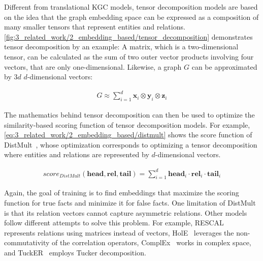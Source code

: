 Different from translational KGC models, tensor decomposition models are based on the idea that the graph embedding space can be expressed as a composition of many smaller tensors that represent entities and relations. \autoref{fig:3_related_work/2_embedding_based/tensor_decomposition} demonstrates tensor decomposition by an example: A matrix, which is a two-dimensional tensor, can be calculated as the sum of two outer vector products involving four vectors, that are only one-dimensional. Likewise, a graph $G$ can be approximated by $3d$ $d$-dimensional vectors:

\begin{align}
    G \approx \sum_{i=1}^{d} \textbf{x}_i \otimes \textbf{y}_i \otimes \textbf{z}_i
    \label{eq:3_related_work/2_embedding_based/tensor_decomposition}
\end{align}

The mathematics behind tensor decomposition can then be used to optimize the similarity-based scoring function of tensor decomposition models. For example, \autoref{eq:3_related_work/2_embedding_based/distmult} shows the score function of DistMult~\cite{Yang2015EmbeddingEA}, whose optimization corresponds to optimizing a tensor decomposition where entities and relations are represented by $d$-dimensional vectors.

\begin{align}
    score_{DistMult}(\textbf{head}, \textbf{rel}, \textbf{tail}) = \sum_{i=1}^{d} \textbf{head}_i \cdot \textbf{rel}_i \cdot \textbf{tail}_i
    \label{eq:3_related_work/2_embedding_based/distmult}
\end{align}

Again, the goal of training is to find embeddings that maximize the scoring function for true facts and minimize it for false facts. One limitation of DistMult is that its relation vectors cannot capture asymmetric relations. Other models follow different attempts to solve this problem. For example, RESCAL~\cite{Nickel2013TensorFF} represents relations using matrices instead of vectors, HolE~\cite{Nickel2016HolographicEO} leverages the non-commutativity of the correlation operators, ComplEx~\cite{Trouillon2016ComplexEF} works in complex space, and TuckER~\cite{Balazevic2019TuckERTF} employs Tucker decomposition.

